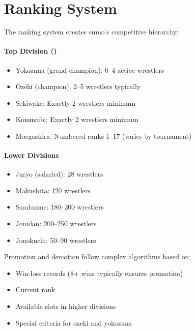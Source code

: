 \section{Ranking System}

The  ranking system creates sumo's competitive hierarchy:

\paragraph{Top Division ()}
\begin{itemize}
\item Yokozuna (grand champion): 0--4 active wrestlers
\item Ozeki (champion): 2--5 wrestlers typically
\item Sekiwake: Exactly 2 wrestlers minimum
\item Komusubi: Exactly 2 wrestlers minimum
\item Maegashira: Numbered ranks 1--17 (varies by tournament)
\end{itemize}

\paragraph{Lower Divisions}
\begin{itemize}
\item Juryo (salaried): 28 wrestlers
\item Makushita: 120 wrestlers
\item Sandanme: 180--200 wrestlers
\item Jonidan: 200--250 wrestlers
\item Jonokuchi: 50--90 wrestlers
\end{itemize}

Promotion and demotion follow complex algorithms based on:
\begin{itemize}
\item Win-loss records (8+ wins typically ensures promotion)
\item Current rank
\item Available slots in higher divisions
\item Special criteria for ozeki and yokozuna
\end{itemize}